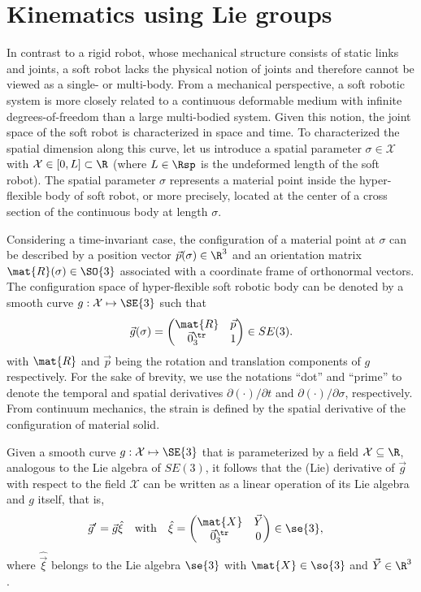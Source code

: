\section{Kinematics using Lie groups}
In contrast to a rigid robot, whose mechanical structure consists of static links and joints, a soft robot lacks the physical notion of joints and therefore cannot be viewed as a single- or multi-body. From a mechanical perspective, a soft robotic system is more closely related to a continuous deformable medium with infinite degrees-of-freedom than a large multi-bodied system. Given this notion, the joint space of the soft robot is characterized in space and time. To characterized the spatial dimension along this curve, let us introduce a spatial parameter $\sigma \in \mathcal{X}$ with $\mathcal{X} \in [0,L] \subset \R$ (where $L \in \Rsp$ is the undeformed length of the soft robot). The spatial parameter $\sigma$ represents a material point inside the hyper-flexible body of soft robot, or more precisely, located at the center of a cross section of the continuous body at length $\sigma$. 

Considering a time-invariant case, the configuration of a material point at $\sigma$ can be described by a position vector $\vec{p}(\sigma) \in \R^3$ and an orientation matrix $\mat{R}(\sigma) \in \SO{3}$ associated with a coordinate frame of orthonormal vectors. The configuration space of hyper-flexible soft robotic body can be denoted by a smooth curve $g:\mathcal{X} \mapsto \SE{3}$ such that
\begin{equation}
\vec{g}(\sigma) = \begin{pmatrix} \mat{R} & \vec{p} \\ \vec{0}_3^\tr & 1 \end{pmatrix} \in SE(3). 
\end{equation}
with $\mat{R}$ and $\vec{p}$ being the rotation and translation components of $g$ respectively. For the sake of brevity, we use the notations ``dot'' and ``prime'' to denote the temporal and spatial derivatives $\partial(\cdot)/\partial t$ and $\partial(\cdot)/\partial \sigma$, respectively. From continuum mechanics, the strain is defined by the spatial derivative of the configuration of material solid.

\begin{lemma}
\label{lemma:g_deriv}
Given a smooth curve $g: \mathcal{X} \mapsto \SE{3}$ that is parameterized by a field $\mathcal{X} \subseteq \R$, analogous to the Lie algebra of $SE(3)$, it follows that the (Lie) derivative of $\vec{g}$ with respect to the field $\mathcal{X}$ can be written as a linear operation of its Lie algebra and $g$ itself, that is,
\begin{align}
\vec{g}' & = \vec{g}\hat{\xi} \quad \text{with} \quad \hat{\xi} = \begin{pmatrix} \mat{X} & \vec{Y} \\ \vec{0}_3^\tr & 0 \end{pmatrix} \in \se{3},  \label{eq:gprime}
\end{align}
where $\hat{\vec{\xi}}$ belongs to the Lie algebra $\se{3}$ with $\mat{X} \in \so{3}$ and $\vec{Y} \in \R^3$. 
\end{lemma}

